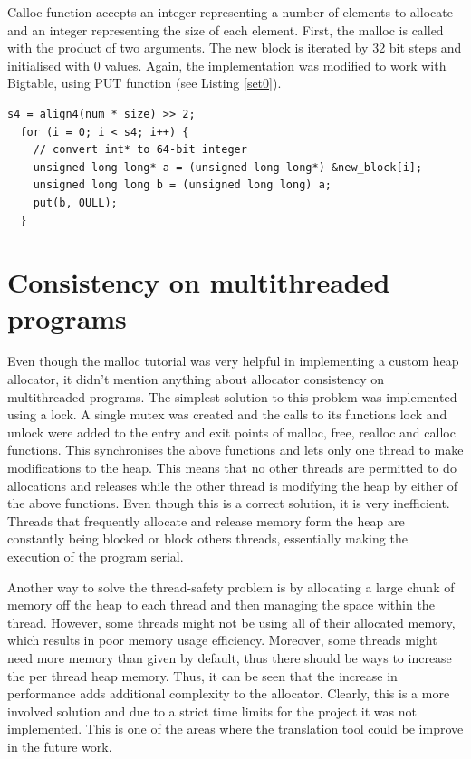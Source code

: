 \documentclass[bsc,frontabs,twoside,singlespacing,parskip,deptreport]{infthesis}     %
\begin{document}
Calloc function accepts an integer representing a number of elements to allocate and an integer representing the size of each element. First, the malloc is called with the product of two arguments. The new block is iterated by 32 bit steps and initialised with 0 values. Again, the implementation was modified to work with Bigtable, using PUT function (see Listing \ref{set0}).

\begin{lstlisting}[caption=new\_block initialisation with zeroes, label=set0, style=block]
  s4 = align4(num * size) >> 2;
  for (i = 0; i < s4; i++) {
    // convert int* to 64-bit integer
    unsigned long long* a = (unsigned long long*) &new_block[i];
    unsigned long long b = (unsigned long long) a;
    put(b, 0ULL);
  }
\end{lstlisting}


\section{Consistency on multithreaded programs}

Even though the malloc tutorial was very helpful in implementing a custom heap allocator, it didn't mention anything about allocator consistency on multithreaded programs. The simplest solution to this problem was implemented using a lock. A single mutex was created and the calls to its functions lock and unlock were added to the entry and exit points of malloc, free, realloc and calloc functions. This synchronises the above functions and lets only one thread to make modifications to the heap. This means that no other threads are permitted to do allocations and releases while the other thread is modifying the heap by either of the above functions. Even though this is a correct solution, it is very inefficient. Threads that frequently allocate and release memory form the heap are constantly being blocked or block others threads, essentially making the execution of the program serial.

Another way to solve the thread-safety problem is by allocating a large chunk of memory off the heap to each thread and then managing the space within the thread. However, some threads might not be using all of their allocated memory, which results in poor memory usage efficiency. Moreover, some threads might need more memory than given by default, thus there should be ways to increase the per thread heap memory. Thus, it can be seen that the increase in performance adds additional complexity to the allocator. Clearly, this is a more involved solution and due to a strict time limits for the project it was not implemented. This is one of the areas where the translation tool could be improve in the future work.
\end{document}

